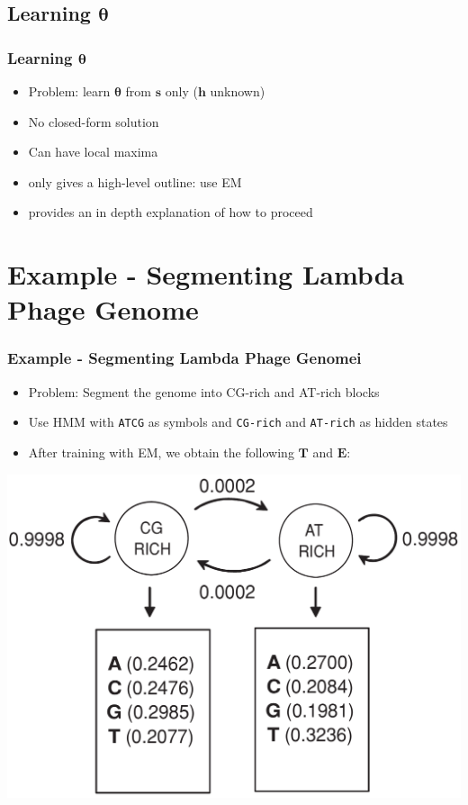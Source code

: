 \documentclass[11pt]{beamer}
\newcommand{\vect}[1]{\boldsymbol{\mathbf{#1}}}
\begin{document}
    \subsection{Learning \texorpdfstring{$\vect{\theta}$}{TEXT}}
    \begin{frame}
        \frametitle{Learning $\vect{\theta}$}
        \begin{itemize}
            \item Problem: learn $\vect{\theta}$ from $\vect{s}$ only ($\vect{h}$ unknown)
            \item No closed-form solution
            \item Can have local maxima
            \item \cite{cristianini2006introduction} only gives a high-level outline: use EM
            \item \cite{Bishop2006} provides an in depth explanation of how to proceed
        \end{itemize}
    \end{frame}
    
    \section{Example - Segmenting Lambda Phage Genome}
    \begin{frame}
        \frametitle{Example - Segmenting Lambda Phage Genome\quad i}
        \begin{itemize}
            \item Problem: Segment the genome into CG-rich and AT-rich blocks
            \item Use HMM with \texttt{ATCG} as symbols and \texttt{CG-rich} and \texttt{AT-rich} as hidden states
            \item After training with EM, we obtain the following $\vect{T}$ and $\vect{E}$:
        \end{itemize}
        \centering
        \includegraphics[scale=0.2]{images/lp_seg_params.png}
    \end{frame}
\end{document}
